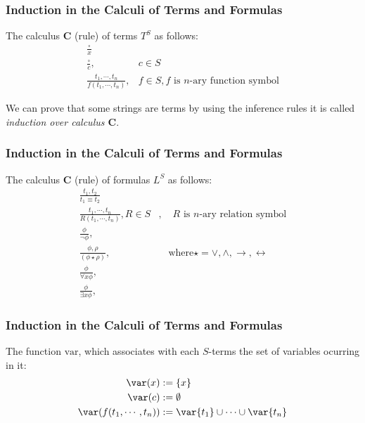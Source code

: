 \begin{frame}
    \frametitle{Induction in the Calculi of Terms and Formulas}

    The calculus $\mathbf{C}$ (rule) of terms $T^S$ as follows: 
    \begin{align}\label{def:calculus_terms}
        \frac{\square}{x} & \\
        \frac{\square}{c}, & c \in S \\
        \frac{t_1, \cdots, t_n}{f(t_1, \cdots, t_n)},& f \in S, f \text{ is $n$-ary function symbol}
    \end{align}

    We can prove that some strings are terms by using the inference rules it is called \textit{induction over calculus $\mathbf{C}$}. \\
\end{frame}

\begin{frame}
    \frametitle{Induction in the Calculi of Terms and Formulas}

    The calculus $\mathbf{C}$ (rule) of formulas $L^S$ as follows:
    \begin{align}\label{def:calculus_formulas}
        \frac{t_1, t_2}{t_1 \equiv t_2} & \\
        \frac{t_1, \cdots, t_n}{R(t_1, \cdots, t_n)}, R \in S&, \quad R \text{ is $n$-ary relation symbol} \\
        \frac{\phi}{\neg \phi}, & \\
        \frac{\phi, \rho}{(\phi \star \rho)}, & \quad \text{where} \star = \vee, \wedge, \rightarrow, \leftrightarrow \\
        \frac{\phi}{\forall x \phi}, & \\
        \frac{\phi}{\exists x \phi}, &
    \end{align}
\end{frame}

\begin{frame}
    \frametitle{Induction in the Calculi of Terms and Formulas}

    \begin{Definition}\label{def:variables}
        The function $\textrm{var}$, which associates with each $S$-terms the set of variables ocurring in it:
        \begin{align*}
            \var({x}) &:= \{x\} \\
            \var({c}) &:= \emptyset \\
            \var({f(t_1, \cdots, t_n)}) &:= \var{t_1} \cup \cdots \cup \var{t_n}
        \end{align*}
    \end{Definition}
    
\end{frame}

